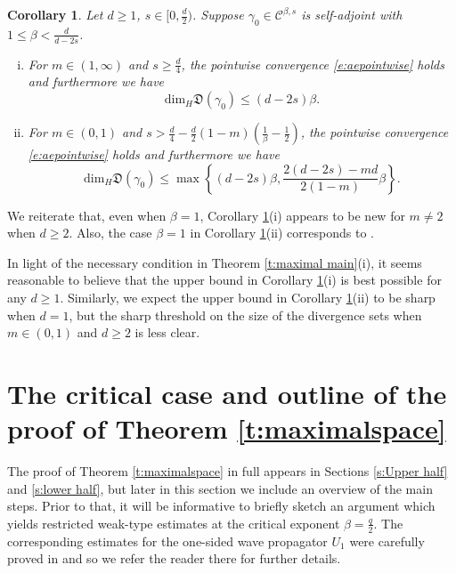 \documentclass[a4paper]{amsart}
\numberwithin{equation}{section}%
\theoremstyle{plain}%
\newtheorem{corollary}[theorem]{Corollary}
\theoremstyle{definition}
\theoremstyle{remark}%
\def\dim{\mathrm{dim}}
\def\C{\mathcal{C}}
\def\C{\mathcal{C}}
\begin{document}
\begin{corollary}\label{c:div set}
Let $d \geq1$, $s \in [0,\frac{d}{2})$. Suppose $\gamma_0 \in \C^{\beta,s}$ is self-adjoint with $1 \leq \beta<\frac{d}{d-2s}$. 
\begin{enumerate}[(i)]
\item
For $m\in(1,\infty)$ and $s \geq \frac d4$, the pointwise convergence \eqref{e:aepointwise} holds and furthermore we have
\[
\dim_H\mathfrak D(\gamma_0)
\leq
(d-2s)\beta.
\]
\item \label{item:divset m less 1}
For $m\in(0,1)$ and $s > \frac d4-\frac d2(1-m)(\frac 1\beta-\frac12)$, the pointwise convergence \eqref{e:aepointwise} holds and furthermore we have
\[
\dim_{H}\mathfrak D(\gamma_0)
\leq
\max\left\{
(d-2s)\beta,
\frac{2(d-2s)-md}{2(1-m)}\beta
\right\}.
\]
\end{enumerate} 
\end{corollary}
We reiterate that, even when $\beta = 1$, Corollary \ref{c:div set}(i) appears to be new for $m \neq 2$ when $d \geq 2$. Also, the case $\beta = 1$ in Corollary \ref{c:div set}(ii) corresponds to \cite[Theorem 1]{CS22}.

In light of the necessary condition in Theorem \ref{t:maximal main}(i), it seems reasonable to believe that the upper bound in Corollary \ref{c:div set}(i) is best possible for any $d \geq 1$. Similarly, we expect the upper bound in Corollary \ref{c:div set}(ii) to be sharp when $d = 1$, but the sharp threshold on the size of the divergence sets when $m \in (0,1)$ and $d \geq 2$ is less clear.







\section{The critical case and outline of the proof of Theorem \ref{t:maximalspace}}\label{s:Motivation Outline}
The proof of Theorem \ref{t:maximalspace} in full appears in Sections \ref{s:Upper half} and \ref{s:lower half}, but later in this section we include an overview of the main steps. Prior to that, it will be informative to briefly sketch an argument which yields restricted weak-type estimates at the critical exponent $\beta = \frac{q}{2}$. The corresponding estimates for the one-sided wave propagator $U_1$ were carefully proved in \cite{BKS_RIMS} and so we refer the reader there for further details.
\end{document}
